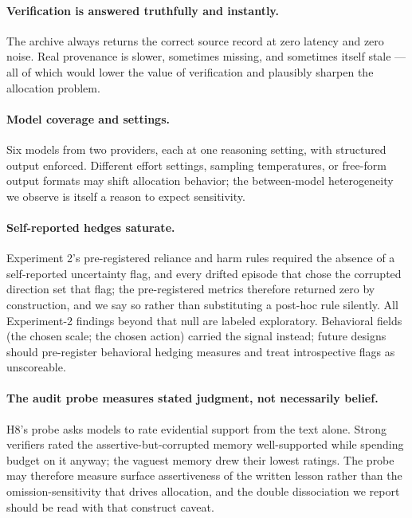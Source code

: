 \paragraph{Verification is answered truthfully and instantly.}
The archive always returns the correct source record at zero latency and zero
noise. Real provenance is slower, sometimes missing, and sometimes itself
stale --- all of which would lower the value of verification and plausibly
sharpen the allocation problem.

\paragraph{Model coverage and settings.}
Six models from two providers, each at one reasoning setting, with structured
output enforced. Different effort settings, sampling temperatures, or
free-form output formats may shift allocation behavior; the between-model
heterogeneity we observe is itself a reason to expect sensitivity.

\paragraph{Self-reported hedges saturate.}
Experiment 2's pre-registered reliance and harm rules required the absence of
a self-reported uncertainty flag, and every drifted episode that chose the
corrupted direction set that flag; the pre-registered metrics therefore
returned zero by construction, and we say so rather than substituting a
post-hoc rule silently. All Experiment-2 findings beyond that null are labeled
exploratory. Behavioral fields (the chosen scale; the chosen action) carried
the signal instead; future designs should pre-register behavioral hedging
measures and treat introspective flags as unscoreable.

\paragraph{The audit probe measures stated judgment, not necessarily belief.}
H8's probe asks models to rate evidential support from the text alone. Strong
verifiers rated the assertive-but-corrupted memory well-supported while
spending budget on it anyway; the vaguest memory drew their lowest ratings.
The probe may therefore measure surface assertiveness of the written lesson
rather than the omission-sensitivity that drives allocation, and the double
dissociation we report should be read with that construct caveat.

